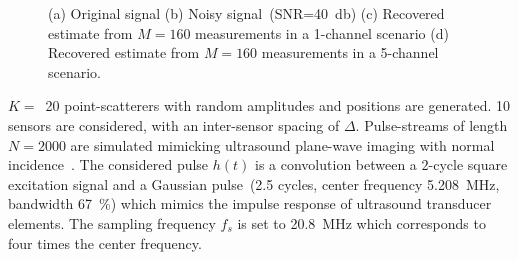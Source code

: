 \documentclass{article}
\theoremstyle{definition}
\begin{document}
\begin{figure}[htb]
	\hfill%
	\hfill%
	\caption{(a) Original signal (b) Noisy signal~(SNR=\SI{40}{\decibel}) (c) Recovered estimate from $M=160$ measurements in a \num{1}-channel scenario (d) Recovered estimate from $M=160$ measurements in a \num{5}-channel scenario.}
	\label{fig_synth_noisy}
\end{figure}

$K=$~\num{20} point-scatterers with random amplitudes and positions are generated. 
\num{10} sensors are considered, with an inter-sensor spacing of $\Delta$. Pulse-streams of length $N = 2000$ are simulated mimicking ultrasound plane-wave imaging with normal incidence~\cite{montaldo_uffc_2014}.
The considered pulse $h\left(t\right)$ is a convolution between a $2$-cycle square excitation signal and a Gaussian pulse~(\num{2.5} cycles, center frequency \SI{5.208}{\mega\hertz}, bandwidth \SI{67}{\percent}) which mimics the impulse response of ultrasound transducer elements. The sampling frequency $f_s$ is set to \SI{20.8}{\mega\hertz} which corresponds to four times the center frequency.
\end{document}
